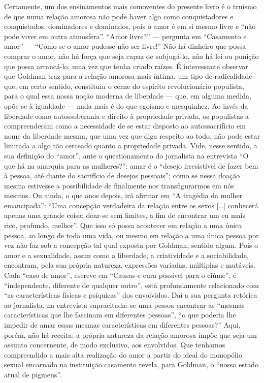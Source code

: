 Certamente, um dos ensinamentos mais comoventes do presente livro é o
truísmo de que numa relação amorosa não pode haver algo como
conquistadores e conquistados, dominadores e dominados, pois o amor é em
si mesmo livre e ``não pode viver em outra atmosfera''. ``Amor livre?''
--- pergunta em ``Casamento e amor'' --- ``Como se o amor pudesse não ser
livre!'' Não há dinheiro que possa comprar o amor, não há força que seja
capaz de subjugá-lo, não há lei ou punição que possa arrancá-lo, uma vez
que tenha criado raízes. É interessante observar que Goldman traz para a
relação amorosa mais íntima, um tipo de radicalidade que, em certo
sentido, constituiu o cerne do espírito revolucionário populista, para o
qual essa nossa noção moderna de liberdade --- que, em alguma medida,
opõe-se à igualdade --- nada mais é do que egoísmo e mesquinhez. Ao invés
da liberdade como autossoberania e direito à propriedade privada, os
populistas a compreenderam como a necessidade de se estar disposto ao
autossacrifício em nome da liberdade mesma, que uma vez que diga
respeito ao todo, não pode estar limitada a algo tão cerceado quanto a
propriedade privada. Vide, nesse sentido, a sua definição do ``amor'',
ante o questionamento do jornalista na entrevista ``O que há na anarquia
para as mulheres?'': amar é o ``desejo irresistível de fazer bem à
pessoa, até diante do sacrifício de desejos pessoais''; como se nessa
doação mesma estivesse a possibilidade de finalmente nos transfigurarmos
em nós mesmos. Ou ainda, o que anos depois, irá afirmar em ``A tragédia
da mulher emancipada'': ``Uma concepção verdadeira da relação entre os
sexos {[}\ldots{]} conhecerá apenas uma grande coisa: doar-se sem limites,
a fim de encontrar um eu mais rico, profundo, melhor''. Que isso só
possa acontecer em relação a uma única pessoa, ao longo de toda uma
vida, ou mesmo em relação a uma única pessoa por vez não faz sob a
concepção tal qual exposta por Goldman, sentido algum. Pois o amor e a
sexualidade, assim como a liberdade, a criatividade e a sociabilidade,
encontram, pela sua própria natureza, expressões variadas, múltiplas e
mutáveis. Cada ``caso de amor'', escreve em ``Causas e cura possível
para o ciúme'', é ``independente, diferente de qualquer outro'', está
profundamente relacionado com ``as características físicas e psíquicas''
dos envolvidos. Daí a sua pergunta retórica ao jornalista, na entrevista
supracitada: se uma pessoa encontrar as ``mesmas características que lhe
fascinam em diferentes pessoas'', ``o que poderia lhe impedir de amar
essas mesmas características em diferentes pessoas?'' Aqui, porém, não
há receita: a própria natureza da relação amorosa impõe que seja um
assunto concernente, de modo exclusivo, aos envolvidos. Que tenhamos
compreendido a mais alta realização do amor a partir do ideal do
monopólio sexual encarnado na instituição casamento revela, para
Goldman, o ``nosso estado atual de pigmeus''.

